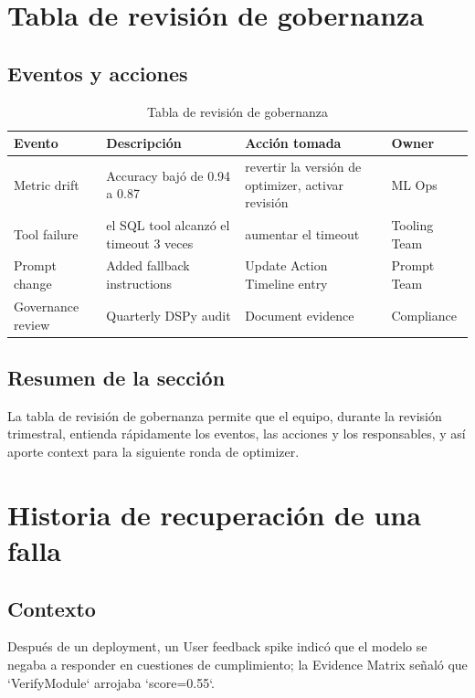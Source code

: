 \documentclass[a4paper]{article}
\begin{document}
\section{Tabla de revisión de gobernanza}

\subsection{Eventos y acciones}

\begin{table}[H]
\centering
\caption{Tabla de revisión de gobernanza}
\begin{tabular}{p{}p{}p{}p{}}
\toprule
Evento & Descripción & Acción tomada & Owner \\
\midrule
Metric drift & Accuracy bajó de 0.94 a 0.87 & revertir la versión de optimizer, activar revisión & ML Ops \\
Tool failure & el SQL tool alcanzó el timeout 3 veces & aumentar el timeout & Tooling Team \\
Prompt change & Added fallback instructions & Update Action Timeline entry & Prompt Team \\
Governance review & Quarterly DSPy audit & Document evidence & Compliance \\
\bottomrule
\end{tabular}
\end{table}

\subsection{Resumen de la sección}

La tabla de revisión de gobernanza permite que el equipo, durante la revisión trimestral, entienda rápidamente los eventos, las acciones y los responsables, y así aporte context para la siguiente ronda de optimizer.

\section{Historia de recuperación de una falla}

\subsection{Contexto}

Después de un deployment, un User feedback spike indicó que el modelo se negaba a responder en cuestiones de cumplimiento; la Evidence Matrix señaló que `VerifyModule` arrojaba `score=0.55`.
\end{document}

